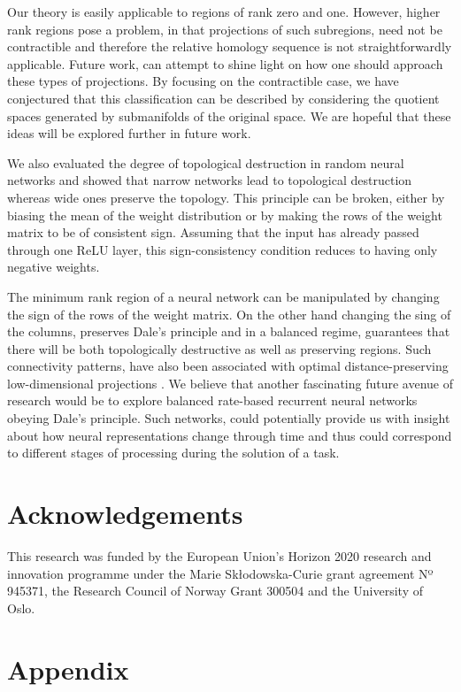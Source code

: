Our theory is easily applicable to regions of rank zero and one. However, higher rank regions pose a problem, in that projections of such subregions, need not be contractible and therefore the relative homology sequence is not straightforwardly applicable. Future work, can attempt to shine light on how one should approach these types of projections. By focusing on the contractible case, we have conjectured that this classification can be described by considering the quotient spaces generated by submanifolds of the original space. We are hopeful that these ideas will be explored further in future work. 

We also evaluated the degree of topological destruction in random neural networks and showed that narrow networks lead to topological destruction whereas wide ones preserve the topology. This principle can be broken, either by biasing the mean of the weight distribution or by making the rows of the weight matrix to be of consistent sign. Assuming that the input has already passed through one ReLU layer, this sign-consistency condition reduces to having only negative weights.

The minimum rank region of a neural network can be manipulated by changing the sign of the rows of the weight matrix. On the other hand changing the sing of the columns, preserves Dale's principle and in a balanced regime, guarantees that there will be both topologically destructive as well as preserving regions. Such connectivity patterns, have also been associated with optimal distance-preserving low-dimensional projections \cite{allen2014sparse}. We believe that another fascinating future avenue of research would be to explore balanced rate-based recurrent neural networks obeying Dale's principle. Such networks, could potentially provide us with insight about how neural representations change through time and thus could correspond to different stages of processing during the solution of a task.

\section{Acknowledgements}
This research was funded by the European Union's Horizon 2020 research and innovation programme under the Marie Skłodowska-Curie grant agreement Nº 945371, the Research Council of Norway Grant 300504 and the University of Oslo.



\newpage


\section{Appendix}
\label{sec: appendix}
